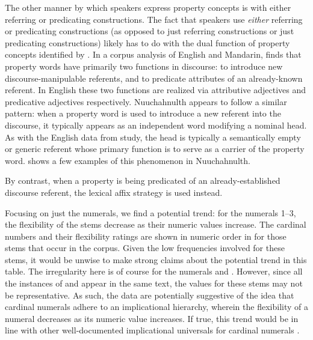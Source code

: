 The other manner by which speakers express property concepts is with either referring or predicating constructions. The fact that speakers use \emph{either} referring or predicating constructions (as opposed to just referring constructions or just predicating constructions) likely has to do with the dual function of property concepts identified by \textcite{Thompson1989}. In a corpus analysis of English and Mandarin, \citeauthor{Thompson1989} finds that property words have primarily two functions in discourse: to introduce new discourse-manipulable referents, and to predicate attributes of an already-known referent. In English these two functions are realized via attributive adjectives and predicative adjectives respectively. Nuuchahnulth appears to follow a similar pattern: when a property word is used to introduce a new referent into the discourse, it typically appears as an independent word modifying a nominal head. As with the English data from  study, the head is typically a semantically empty or generic referent whose primary function is to serve as a carrier of the property word.  shows a few examples of this phenomenon in Nuuchahnulth.


\noindent By contrast, when a property is being predicated of an already-established discourse referent, the lexical affix strategy is used instead.

Focusing on just the numerals, we find a potential trend: for the numerals 1–3, the flexibility of the stems decrease as their numeric values increase. The cardinal numbers and their flexibility ratings are shown in numeric order in  for those stems that occur in the corpus. Given the low frequencies involved for these stems, it would be unwise to make strong claims about the potential trend in this table. The irregularity here is of course for the numerals  and . However, since all the instances of  and  appear in the same text, the values for these stems may not be representative. As such, the data are potentially suggestive of the idea that cardinal numerals adhere to an implicational hierarchy, wherein the flexibility of a numeral decreases as its numeric value increases. If true, this trend would be in line with other well-documented implicational universals for cardinal numerals \parencites{DehaeneMiller1992}[141]{Croft2003} .

